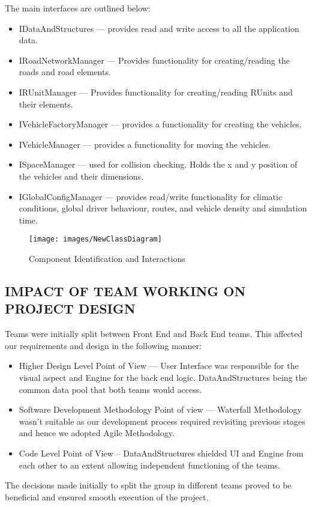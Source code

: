 \documentclass[11pt,a4paper]{article}
\begin{document}
  \setlength{\parindent}{0cm}\bigskip
  The main interfaces are outlined below:
	\begin{itemize}
		\item IDataAndStructures --- provides read and write access to all the application data.
		\item IRoadNetworkManager --- Provides functionality for creating/reading the roads and road elements.
		\item IRUnitManager --- Provides functionality for creating/reading RUnits and their elements.
		\item IVehicleFactoryManager --- provides a functionality for creating the vehicles.
		\item IVehicleManager --- provides a functionality for moving the vehicles.
		\item ISpaceManager --- used for collision checking. Holds the x and y position of the vehicles and their dimensions.
		\item IGlobalConfigManager --- provides read/write functionality for climatic conditions, global driver behaviour, routes, and vehicle density and simulation time.
	\end{itemize}
	
		\begin{figure}[h]
			\texttt{[image: images/NewClassDiagram]}
			\caption{Component Identification and Interactions}
			\centering
		\end{figure}
		
  \subsection{IMPACT OF TEAM WORKING ON PROJECT DESIGN}
  	Teams were initially split between Front End and Back End teams. 
  	This affected our requirements and design in the following manner:
	\begin{itemize}
		\item Higher Design Level Point of View --- User Interface was responsible for the visual aspect and Engine for the back end logic. DataAndStructures being the common data pool that both teams would access.
		\item Software Development Methodology Point of view --- Waterfall Methodology wasn’t suitable as our development process required revisiting previous stages and hence we adopted Agile Methodology.
		\item Code Level Point of View – DataAndStructures shielded UI and Engine from each other to an extent allowing independent functioning of the teams.  
	\end{itemize}
	The decisions made initially to split the group in different teams
	proved to be beneficial and ensured smooth execution of the
	project.
\end{document}
